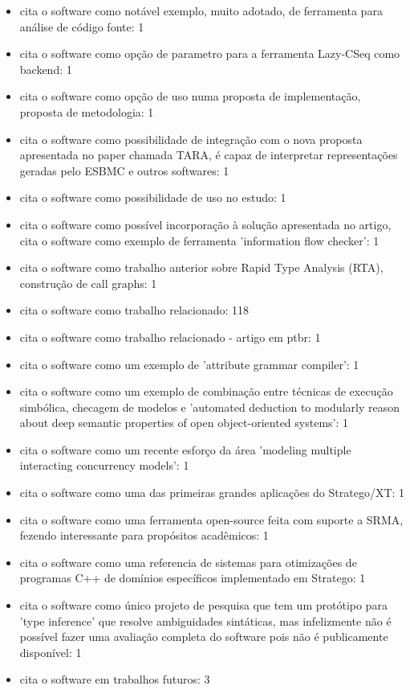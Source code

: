 \begin{itemize}
\item cita o software como notável exemplo, muito adotado, de ferramenta para análise de código fonte: 1
\item cita o software como opção de parametro para a ferramenta Lazy-CSeq como backend: 1
\item cita o software como opção de uso numa proposta de implementação, proposta de metodologia: 1
\item cita o software como possibilidade de integração com o nova proposta apresentada no paper chamada TARA, é capaz de interpretar representações geradas pelo ESBMC e outros softwares: 1
\item cita o software como possibilidade de uso no estudo: 1
\item cita o software como possível incorporação à solução apresentada no artigo, cita o software como exemplo de ferramenta 'information flow checker': 1
\item cita o software como trabalho anterior sobre Rapid Type Analysis (RTA), construção de call graphs: 1
\item cita o software como trabalho relacionado: 118
\item cita o software como trabalho relacionado - artigo em ptbr: 1
\item cita o software como um exemplo de 'attribute grammar compiler': 1
\item cita o software como um exemplo de combinação entre técnicas de execução simbólica, checagem de modelos e 'automated deduction to modularly reason about deep semantic properties of open object-oriented systems': 1
\item cita o software como um recente esforço da área 'modeling multiple interacting concurrency models': 1
\item cita o software como uma das primeiras grandes aplicações do Stratego/XT: 1
\item cita o software como uma ferramenta open-source feita com suporte a SRMA, fezendo interessante para propósitos acadêmicos: 1
\item cita o software como uma referencia de sistemas para otimizações de programas C++ de domínios específicos implementado em Stratego: 1
\item cita o software como único projeto de pesquisa que tem um protótipo para 'type inference' que resolve ambiguidades sintáticas, mas infelizmente não é possível fazer uma avaliação completa do software pois não é publicamente disponível: 1
\item cita o software em trabalhos futuros: 3

\end{itemize}
